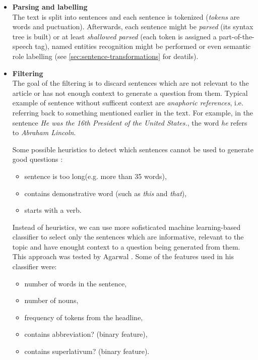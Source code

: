 \documentclass[a4paper, 12pt, twoside]{fithesis2}		%
\renewcommand{\_}{\leavevmode \kern0.07em\vbox{\hrule width0.4em}}
\newcommand{\squarebullet}{\textcolor{black}{\raisebox{0.15em}{\rule{4pt}{4pt}}}}
\newcommand{\emptysquarebullet}{\textcolor{black}{\raisebox{0.10em}{\tiny$\square$}}}
\newenvironment{myItemize}{
  \begin{itemize}[leftmargin=2em,rightmargin=1em,itemsep=\parskip ,parsep=0em,topsep=0em,partopsep=0em]
  \renewcommand{\labelitemi}{\squarebullet}
  \renewcommand{\labelitemii}{\textbullet}
}{
  \end{itemize}
}
\begin{document}
\begin{myItemize}
  \item \textbf{Parsing and labelling}\\
    The text is split into sentences and each sentence is tokenized (\emph{tokens} are words and puctuation).
    Afterwards, each sentence might be \emph{parsed} (its syntax tree is built) or at least \textit{shallowed parsed} (each token is assigned a part-of-the-speech tag),
    named entities recognition might be performed or even semantic role labelling
    (see \autoref{sec:sentence-transformations} for deatils).

  \item \textbf{Filtering}\\
    The goal of the filtering is to discard sentences which are not relevant to the article or has not enough context to generate a question from them.
    Typical example of sentence without sufficent context are \emph{anaphoric references},
    i.e. referring back to something mentioned earlier in the text.
    For example, in the sentence \emph{He was the 16th President of the United States.},
    the word \emph{he} refers to \emph{Abraham Lincoln}.

  Some possible heuristics to detect which sentences cannot be used to generate good questions \cite{questions-wolfe}:
  \begin{itemize}
  \item sentence is too long(e.g. more than 35 words),
  \item contains demonstrative word (such as \emph{this} and \emph{that}),
  \item starts with a verb.
  \end{itemize}

  Instead of heuristics, we can use more sofisticated machine learning-based classifier to select only the sentences which are informative, relevant to the topic and have enought context to a question being generated from them. This approach was tested by Agarwal \cite{question-gen-textbooks}.
Some of the features used in his classifier were:
  \begin{itemize}
  \item number of words in the sentence,
  \item number of nouns,
  \item frequency of tokens from the headline,
  \item contains abbreviation? (binary feature),
  \item contains superlativum? (binary feature).
  \end{itemize}


\end{myItemize}
\end{document}
